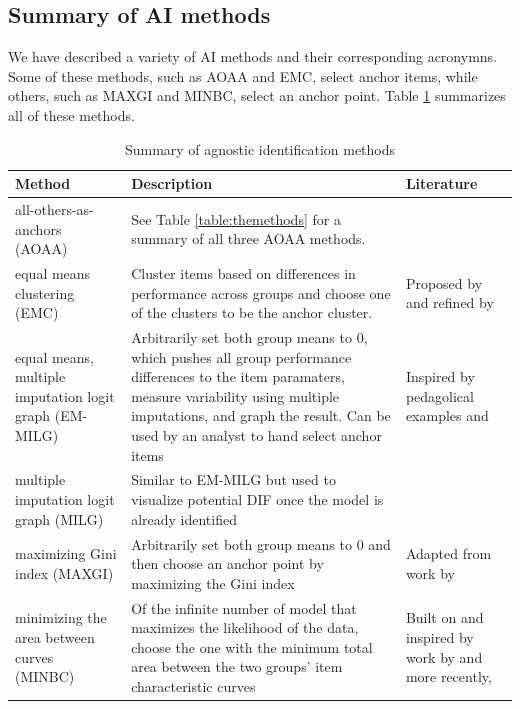 \documentclass[
  11pt,
]{article}
\begin{document}
\hypertarget{summary-of-ai-methods}{%
\subsection{Summary of AI methods}\label{summary-of-ai-methods}}

We have described a variety of AI methods and their corresponding acronymns. Some of these methods, such as AOAA and EMC, select anchor items, while others, such as MAXGI and MINBC, select an anchor point. Table \ref{table:allmethods} summarizes all of these methods.

\begin{table}[H]
\caption{Summary of agnostic identification methods}
\centering
\begin{tabular}{|p{4cm}|p{6cm}|p{4cm}|}
\toprule

Method & Description & Literature \\

\midrule

all-others-as-anchors (AOAA) & See Table \ref{table:themethods} for a summary of all three AOAA methods. &  \\\hline

equal means clustering (EMC) & Cluster items based on differences in performance across groups and choose one of the clusters to be the anchor cluster. & Proposed by \cite{bechger2015statistical} and refined by \cite{pohl2017cluster} \\\hline

equal means, multiple imputation logit graph (EM-MILG) & Arbitrarily set both group means to 0, which pushes all group performance differences to the item paramaters, measure variability using multiple imputations, and graph the result. Can be used by an analyst to hand select anchor items & Inspired by pedagolical examples \cite{pohl2017cluster} and \cite{talbot2013taking} \\\hline

multiple imputation logit graph (MILG) & Similar to EM-MILG but used to visualize potential DIF once the model is already identified &  \\\hline

maximizing Gini index (MAXGI) & Arbitrarily set both group means to 0 and then choose an anchor point by maximizing the Gini index & Adapted from work by \cite{strobl2018anchor} \\\hline

minimizing the area between curves (MINBC) & Of the infinite number of model that maximizes the likelihood of the data, choose the one with the minimum total area between the two groups' item characteristic curves & Built on and inspired by work by \cite{raju1988area} and more recently, \cite{chalmers2016might} \\

\bottomrule
\end{tabular}
\label{table:allmethods}
\end{table}
\end{document}
